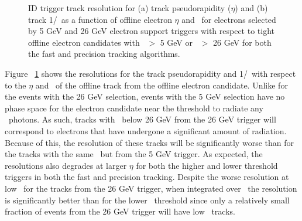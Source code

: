 	\begin{figure}[!hbt]
	\begin{center}
		\hspace{0.05\textwidth}
			\hspace{0.05\textwidth}
	\end{center}	
	\caption{\ac{ID} trigger track resolution for (a) track pseudorapidity ($\eta$) and (b) track 1/\pt\ as a function of offline electron $\eta$ and \pt\ for electrons selected by 5 GeV and 26 GeV electron support triggers with respect to tight offline electron candidates with \pt\ $>$ 5 GeV or \pt\ $>$ 26 GeV for both the fast and precision tracking algorithms.}
	\label{fig:electron_idtrig_res}
	\end{figure}	
	
	Figure ~\ref{fig:electron_idtrig_res} shows the resolutions for the track pseudorapidity and 1/\pt\ with respect to the $\eta$ and \pt\ of the offline track from the offline electron candidate. Unlike for the events with the 26 GeV selection, events with the 5 GeV selection have no phase space for the electron candidate near the threshold to radiate any \brem\ photons. 
	As such, tracks with \pt\ below 26 GeV from the 26 GeV trigger will correspond to electrons that have undergone a significant amount of radiation. Because of this, the resolution of these tracks will be significantly worse than for the tracks with the same \pt\ but from the 5 GeV trigger. 
	As expected, the resolutions also degrades at larger $\eta$ for both the higher and lower threshold triggers in both the fast and precision tracking. Despite the worse resolution at low \pt\ for the tracks from the 26 GeV trigger, when integrated over \pt\, the resolution is significantly better than for the lower \pt\ threshold since only a relatively small fraction of events from the 26 GeV trigger will have low \pt\ tracks. 
